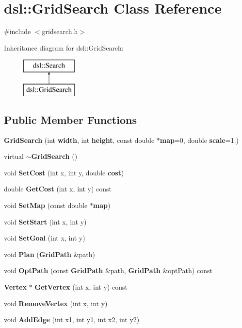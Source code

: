 \section{dsl\-:\-:Grid\-Search Class Reference}
\label{classdsl_1_1GridSearch}


{\ttfamily \#include $<$gridsearch.\-h$>$}

Inheritance diagram for dsl\-:\-:Grid\-Search\-:\begin{figure}[H]
\begin{center}
\leavevmode
\includegraphics[height=2.000000cm]{classdsl_1_1GridSearch}
\end{center}
\end{figure}
\subsection*{Public Member Functions}
\begin{DoxyCompactItemize}
\item 
{\bf Grid\-Search} (int {\bf width}, int {\bf height}, const double $\ast${\bf map}=0, double {\bf scale}=1.)
\item 
virtual {\bf $\sim$\-Grid\-Search} ()
\item 
void {\bf Set\-Cost} (int x, int y, double {\bf cost})
\item 
double {\bf Get\-Cost} (int x, int y) const 
\item 
void {\bf Set\-Map} (const double $\ast${\bf map})
\item 
void {\bf Set\-Start} (int x, int y)
\item 
void {\bf Set\-Goal} (int x, int y)
\item 
void {\bf Plan} ({\bf Grid\-Path} \&path)
\item 
void {\bf Opt\-Path} (const {\bf Grid\-Path} \&path, {\bf Grid\-Path} \&opt\-Path) const 
\item 
{\bf Vertex} $\ast$ {\bf Get\-Vertex} (int x, int y) const 
\item 
void {\bf Remove\-Vertex} (int x, int y)
\item 
void {\bf Add\-Edge} (int x1, int y1, int x2, int y2)
\end{DoxyCompactItemize}
